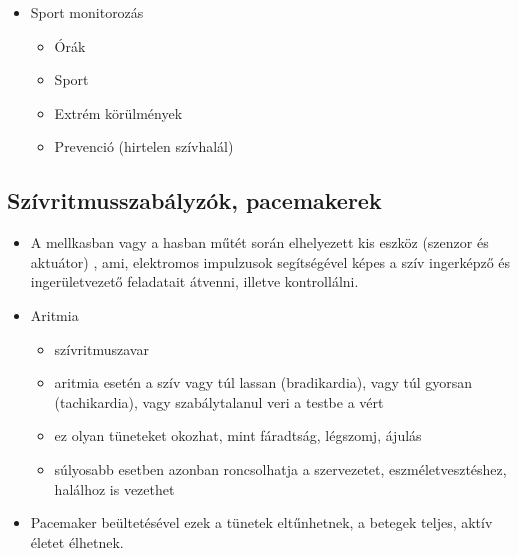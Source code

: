\begin{itemize}
    \item Sport monitorozás
    \begin{itemize}
        \item Órák
        \item Sport
        \item Extrém körülmények
        \item Prevenció (hirtelen szívhalál)
    \end{itemize}
\end{itemize}

\subsection{Szívritmusszabályzók, pacemakerek}
\begin{itemize}
    \item A mellkasban vagy a hasban műtét során elhelyezett kis eszköz
    (szenzor és aktuátor) , ami, elektromos impulzusok segítségével
    képes a szív ingerképző és ingerületvezető feladatait átvenni,
    illetve kontrollálni.
    \item Aritmia
    \begin{itemize}
        \item szívritmuszavar
        \item aritmia esetén a szív vagy túl lassan (bradikardia), vagy túl gyorsan
        (tachikardia), vagy szabálytalanul veri a testbe a vért
        \item ez olyan tüneteket okozhat, mint fáradtság, légszomj, ájulás
        \item súlyosabb esetben azonban roncsolhatja a szervezetet,
        eszméletvesztéshez, halálhoz is vezethet
    \end{itemize}
    \item Pacemaker beültetésével ezek a tünetek eltűnhetnek, a betegek
    teljes, aktív életet élhetnek.
\end{itemize}

